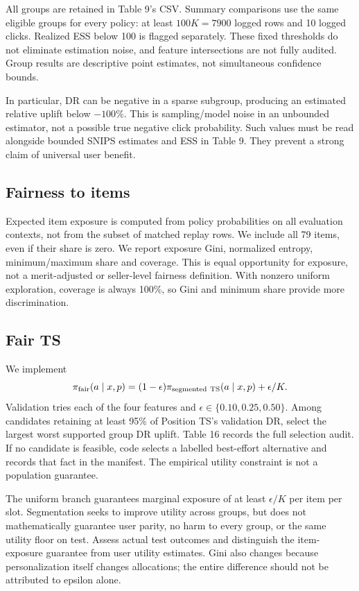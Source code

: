 \documentclass[11pt,a4paper]{article}
\begin{document}
All groups are retained in Table 9's CSV. Summary comparisons use the same eligible
groups for every policy: at least $100K=7900$ logged rows and 10 logged clicks.
Realized ESS below 100 is flagged separately. These fixed thresholds do not eliminate
estimation noise, and feature intersections are not fully audited.
Group results are descriptive point estimates, not simultaneous confidence bounds.

In particular, DR can be negative in a sparse subgroup, producing an estimated relative
uplift below $-100\%$. This is sampling/model noise in an unbounded estimator, not a
possible true negative click probability. Such values must be read alongside bounded
SNIPS estimates and ESS in Table 9. They prevent a strong claim of universal user benefit.

\subsection{Fairness to items}
Expected item exposure is computed from policy probabilities on all evaluation contexts,
not from the subset of matched replay rows. We include all 79 items, even if their share
is zero. We report exposure Gini, normalized entropy, minimum/maximum share and coverage.
This is equal opportunity for exposure, not a merit-adjusted or seller-level fairness
definition. With nonzero uniform exploration, coverage is always 100\%, so Gini and
minimum share provide more discrimination.

\subsection{Fair TS}
We implement
\[
\pi_{\rm fair}(a\mid x,p)=(1-\epsilon)\pi_{\rm segmented\ TS}(a\mid x,p)+\epsilon/K.
\]
Validation tries each of the four features and $\epsilon\in\{0.10,0.25,0.50\}$.
Among candidates retaining at least 95\% of Position TS's validation DR, select the
largest worst supported group DR uplift. Table 16 records the full selection audit.
If no candidate is feasible, code selects a labelled best-effort alternative and records
that fact in the manifest. The empirical utility constraint is not a population guarantee.

The uniform branch guarantees marginal exposure of at least $\epsilon/K$ per item per
slot. Segmentation seeks to improve utility across groups, but does not mathematically
guarantee user parity, no harm to every group, or the same utility floor on test.
Assess actual test outcomes and distinguish the item-exposure guarantee from user
utility estimates. Gini also changes because personalization itself changes allocations;
the entire difference should not be attributed to epsilon alone.
\end{document}
